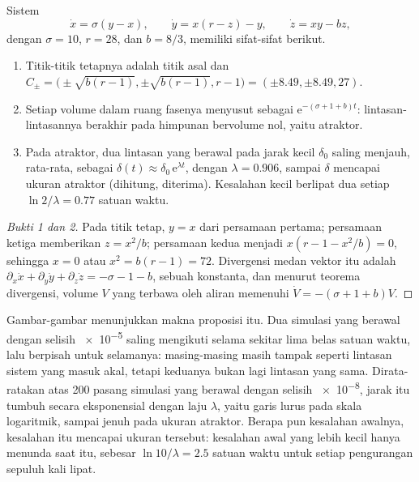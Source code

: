 \begin{proposition}\label{prop:b2:weather-systems:lorenz}
Sistem
\[
  \dot x = \sigma(y - x), \qquad \dot y = x(r - z) - y, \qquad \dot z = xy - bz,
\]
dengan $\sigma = 10$, $r = 28$, dan $b = 8/3$, memiliki sifat-sifat berikut.
\begin{enumerate}
  \item Titik-titik tetapnya adalah titik asal dan $C_\pm = \bigl(\pm\sqrt{b(r - 1)}, \pm\sqrt{b(r - 1)},
        r - 1\bigr) = (\pm 8.49, \pm 8.49, 27)$.
  \item Setiap volume dalam ruang fasenya menyusut sebagai $\mathrm{e}^{-(\sigma + 1 + b)t}$:
        lintasan-lintasannya berakhir pada himpunan bervolume nol, yaitu atraktor.
  \item Pada atraktor, dua lintasan yang berawal pada jarak kecil $\delta_0$ saling menjauh,
        rata-rata, sebagai $\delta(t) \approx \delta_0\,\mathrm{e}^{\lambda t}$, dengan $\lambda =
        0.906$, sampai $\delta$ mencapai ukuran atraktor (dihitung, diterima). Kesalahan
        kecil berlipat dua setiap $\ln 2/\lambda = 0.77$ satuan waktu.
\end{enumerate}
\end{proposition}

\begin{proof}[Bukti 1 dan 2]
Pada titik tetap, $y = x$ dari persamaan pertama; persamaan ketiga memberikan $z = x^2/b$; persamaan kedua
menjadi $x(r - 1 - x^2/b) = 0$, sehingga $x = 0$ atau $x^2 = b(r - 1) = 72$. Divergensi
medan vektor itu adalah $\partial_x\dot x + \partial_y\dot y + \partial_z\dot z = -\sigma - 1 - b$, sebuah
konstanta, dan menurut teorema divergensi, volume $V$ yang terbawa oleh aliran memenuhi $\dot V =
-(\sigma + 1 + b)V$.
\end{proof}

Gambar-gambar menunjukkan makna proposisi itu. Dua simulasi yang berawal dengan selisih \num{e-5} saling mengikuti
selama sekitar lima belas satuan waktu, lalu berpisah untuk selamanya: masing-masing masih tampak seperti
lintasan sistem yang masuk akal, tetapi keduanya bukan lagi lintasan yang sama. Dirata-ratakan atas 200 pasang
simulasi yang berawal dengan selisih \num{e-8}, jarak itu tumbuh secara eksponensial dengan laju $\lambda$, yaitu garis
lurus pada skala logaritmik, sampai jenuh pada ukuran atraktor. Berapa pun
kesalahan awalnya, kesalahan itu mencapai ukuran tersebut: kesalahan awal yang lebih kecil hanya menunda saat itu, sebesar
$\ln 10/\lambda = 2.5$ satuan waktu untuk setiap pengurangan sepuluh kali lipat.

